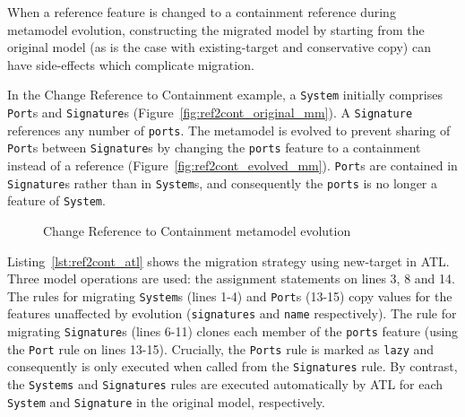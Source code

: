 When a reference feature is changed to a containment reference during metamodel evolution, constructing the migrated model by starting from the original model (as is the case with existing-target and conservative copy) can have side-effects which complicate migration.

In the Change Reference to Containment example, a \texttt{System} initially comprises \texttt{Port}s and \texttt{Signature}s (Figure~\ref{fig:ref2cont_original_mm}). A \texttt{Signature} references any number of \texttt{ports}. The metamodel is evolved to prevent sharing of \texttt{Port}s between \texttt{Signature}s by changing the \texttt{ports} feature to a containment instead of a reference (Figure~\ref{fig:ref2cont_evolved_mm}). \texttt{Port}s are contained in \texttt{Signature}s rather than in \texttt{System}s, and consequently the \texttt{ports} is no longer a feature of \texttt{System}.

\begin{figure}[htbp]
	\centering
	\caption{Change Reference to Containment metamodel evolution}
\label{fig:ref2cont_mms}
\end{figure}

Listing~\ref{lst:ref2cont_atl} shows the migration strategy using new-target in ATL. Three model operations are used: the assignment statements on lines 3, 8 and 14. The rules for migrating \texttt{System}s (lines 1-4) and \texttt{Port}s (13-15) copy values for the features unaffected by evolution (\texttt{signatures} and \texttt{name} respectively). The rule for migrating \texttt{Signature}s (lines 6-11) clones each member of the \texttt{ports} feature (using the \texttt{Port} rule on lines 13-15). Crucially, the \texttt{Ports} rule is marked as \texttt{lazy} and consequently is only executed when called from the \texttt{Signatures} rule. By contrast, the \texttt{Systems} and \texttt{Signatures} rules are executed automatically by ATL for each \texttt{System} and \texttt{Signature} in the original model, respectively. 

